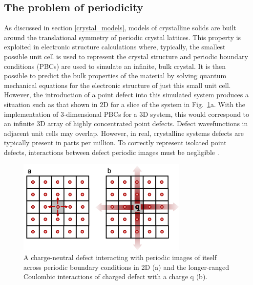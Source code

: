 \documentclass[11pt, twoside]{report}
\begin{document}
\subsection{The problem of periodicity}
As discussed in section \ref{crystal_models}, models of crystalline solids are built around the translational symmetry of periodic crystal lattices. This property is exploited in electronic structure calculations where, typically, the smallest possible unit cell is used to represent the crystal structure and periodic boundary conditions (PBCs) are used to simulate an infinite, bulk crystal. It is then possible to predict the bulk properties of the material by solving quantum mechanical equations for the electronic structure of just this small unit cell. However, the introduction of a point defect into this simulated system produces a situation such as that shown in 2D for a slice of the system in Fig.~\ref{defect_PBCs}a. With the implementation of 3-dimensional PBCs for a 3D system, this would correspond to an infinite 3D array of highly concentrated point defects. Defect wavefunctions in adjacent unit cells may overlap. However, in real, crystalline systems defects are typically present in parts per million.  To correctly represent isolated point defects, interactions between defect periodic images must be negligible \cite{freysoldt_rev}.

\begin{figure}[h!]
  \centering
    \includegraphics[width=0.75\textwidth]{figures/new_ase_defects.png}
    \caption[A charge-neutral defect interacting with periodic images of itself across periodic boundary conditions in 2D (a) and the longer-ranged Coulombic interactions of charged defect with a charge q (b).]{A charge-neutral defect interacting with periodic images of itself across periodic boundary conditions in 2D (a) and the longer-ranged Coulombic interactions of charged defect with a charge q (b).}
  \label{defect_PBCs}
\end{figure}
\end{document}
